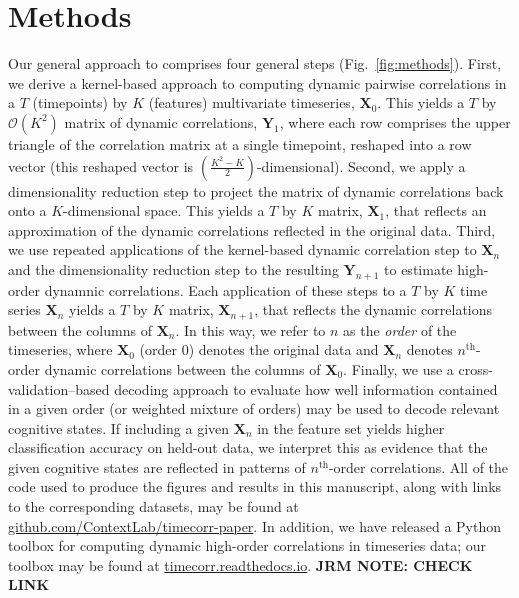 \documentclass[english]{article}
\begin{document}
\section*{Methods}
Our general approach to comprises four general steps
(Fig.~\ref{fig:methods}).  First, we derive a kernel-based approach to
computing dynamic pairwise correlations in a $T$ (timepoints) by $K$
(features) multivariate timeseries, $\mathbf{X}_0$.  This yields a $T$
by $\mathcal{O}(K^2)$ matrix of dynamic correlations, $\mathbf{Y}_1$,
where each row comprises the upper triangle of the correlation matrix
at a single timepoint, reshaped into a row vector (this reshaped
vector is $(\frac{K^2 - K}{2})$-dimensional).  Second, we apply a
dimensionality reduction step to project the matrix of dynamic
correlations back onto a $K$-dimensional space.  This yields a $T$ by
$K$ matrix, $\mathbf{X}_1$, that reflects an approximation of the
dynamic correlations reflected in the original data.  Third, we use
repeated applications of the kernel-based dynamic correlation step to
$\mathbf{X}_n$ and the dimensionality reduction step to the resulting
$\mathbf{Y}_{n+1}$ to estimate high-order dynamnic correlations.  Each
application of these steps to a $T$ by $K$ time series $\mathbf{X}_n$
yields a $T$ by $K$ matrix, $\mathbf{X}_{n+1}$, that reflects the
dynamic correlations between the columns of $\mathbf{X}_n$.  In this
way, we refer to $n$ as the \textit{order} of the timeseries, where
$\mathbf{X}_0$ (order 0) denotes the original data and $\mathbf{X}_n$
denotes $n^\mathrm{th}$-order dynamic correlations between the columns
of $\mathbf{X}_0$.  Finally, we use a cross-validation--based decoding
approach to evaluate how well information contained in a given order
(or weighted mixture of orders) may be used to decode relevant
cognitive states.  If including a given $\mathbf{X}_n$ in the feature
set yields higher classification accuracy on held-out data, we
interpret this as evidence that the given cognitive states are
reflected in patterns of $n^\mathrm{th}$-order correlations.  All of
the code used to produce the figures and results in this manuscript,
along with links to the corresponding datasets, may be found at
\href{https://github.com/ContextLab/timecorr-paper}{github.com/ContextLab/timecorr-paper}.  In addition, we have
released a Python toolbox for computing dynamic high-order
correlations in timeseries data; our toolbox may be found at
\href{https://timecorr.readthedocs.io/}{timecorr.readthedocs.io}. \textbf{JRM NOTE: CHECK LINK}
\end{document}
